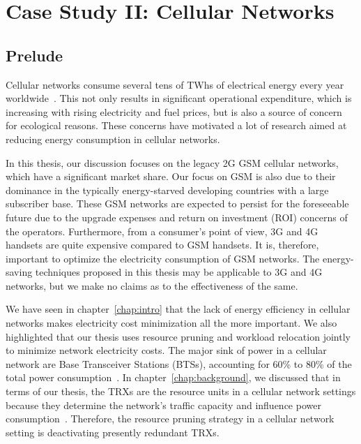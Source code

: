 \chapter{Case Study II: Cellular Networks}
\label{chap:casestudy2}
\section{Prelude}
Cellular networks consume several tens of TWhs of electrical energy
every year worldwide~\cite{Oh:Comm:2011}. This not only results
in significant operational expenditure, which is increasing with
rising electricity and fuel prices, but is also a source of concern
for ecological reasons. These concerns have motivated a lot of research aimed at reducing energy consumption in cellular networks.

In this thesis, our discussion focuses on the legacy 2G GSM cellular networks, which have a significant market share. Our focus on GSM is also due to their dominance in the typically energy-starved developing countries with a large subscriber base. These GSM networks are expected to persist for the foreseeable future due to the upgrade expenses and return on investment (ROI) concerns of the operators. Furthermore, from a consumer's point of view, 3G and 4G handsets are quite expensive compared to GSM handsets. It is, therefore, important to optimize the electricity consumption of GSM networks. The energy-saving techniques proposed in this thesis may be applicable to 3G and 4G networks, but we make no claims as to the effectiveness of the same. 
 
We have seen in chapter~\ref{chap:intro} that the lack of energy efficiency in cellular networks makes electricity cost minimization all the more important. We also highlighted that our thesis uses resource pruning and workload relocation jointly to minimize network electricity costs. The major sink of power in a cellular network are Base Transceiver Stations (BTSs), accounting for 60\% to 80\% of the total power consumption~\cite{Louhi:2007:BTSPower:INTELEC,Oh:Comm:2011,Peng:2011:BTSSaving:Mobicom}. In chapter~\ref{chap:background}, we discussed that in terms of our thesis, the TRXs are the resource units in a cellular network settings because they determine the network's traffic capacity and influence power consumption~\cite{Peng:2011:BTSSaving:Mobicom}. Therefore, the resource pruning strategy in a cellular network setting is deactivating presently redundant TRXs. 

